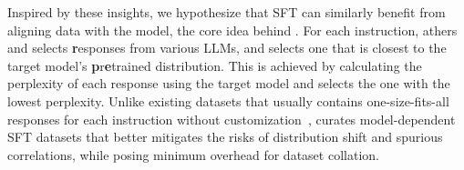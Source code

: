 Inspired by these insights,
we hypothesize that SFT can similarly benefit from aligning data with the model,
the core idea behind \name.
For each instruction, athers and selects {\bf r}esponses from various LLMs,
and selects one that is closest to the target model's {\bf p}r\textbf{e}trained distribution.
This is achieved by calculating the perplexity of each response using the target model and selects the one with the lowest perplexity. 
Unlike existing datasets that usually contains one-size-fits-all responses for each instruction without customization~\cite{yu2024metamath, yuan2024eurus,slimorca,OpenHermes}, \name curates model-dependent SFT datasets that better mitigates the risks of distribution shift  and spurious correlations, while posing minimum overhead for dataset collation. 




